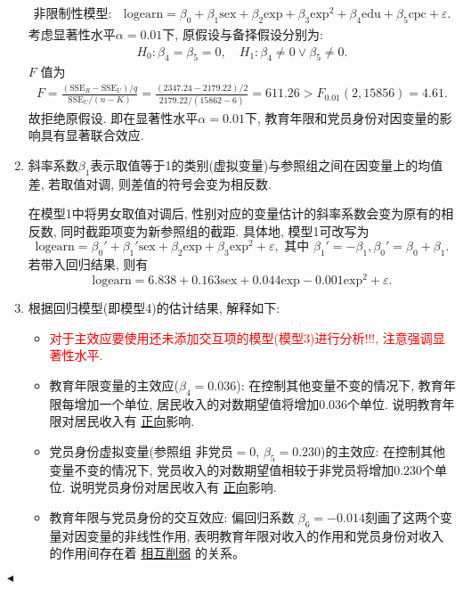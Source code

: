 \documentclass[11pt]{article}
\newenvironment{problem}[2][Problem]{\begin{trivlist}
\item[\hskip \labelsep {\bfseries #1}\hskip \labelsep {\bfseries #2.}]\songti}{\hfill$\blacktriangleleft$\end{trivlist}}
\newcommand\1{\mathds{1}}
\begin{document}
\begin{problem}{1}
\begin{enumerate}[label=(\arabic*)]
\begin{align*}
        \text{非限制性模型: 模型3} \quad &\text{logearn} = \beta_0 + \beta_1 \text{sex} + \beta_2 \text{exp} + \beta_3 \text{exp}^2 + \beta_4 \text{edu} + \beta_5 \text{cpc} + \varepsilon.
    \end{align*}
    考虑显著性水平$\alpha=0.01$下, 原假设与备择假设分别为:
    \begin{align*}
        H_0: \beta_4 = \beta_5 = 0, \quad H_1: \beta_4 \neq 0 \lor \beta_5 \neq 0.
    \end{align*} 
    $F$ 值为 
    \begin{align*}
        F = \frac{(\text{SSE}_R - \text{SSE}_U)/q}{\text{SSE}_U/(n-K)} = \frac{(2347.24-2179.22)/2}{2179.22/(15862 - 6)} = 611.26 > F_{0.01}(2, 15856) = 4.61.
    \end{align*}
    故拒绝原假设. 即在显著性水平$\alpha=0.01$下, 教育年限和党员身份对因变量的影响具有显著联合效应.
    \item  斜率系数$\beta_1$表示取值等于1的类别(虚拟变量)与参照组之间在因变量上的均值差, 若取值对调, 则差值的符号会变为相反数. 

    在模型1中将男女取值对调后, 性别对应的变量估计的斜率系数会变为原有的相反数, 同时截距项变为新参照组的截距. 具体地, 模型1可改写为
    \[
    \text{logearn} = \beta_0' + \beta_1' \text{sex} + \beta_2 \text{exp} + \beta_3 \text{exp}^2 + \varepsilon, \text{ 其中 } \beta_1' = -\beta_1, \beta_0' = \beta_0 + \beta_1.
    \]
    若带入回归结果, 则有
    \[
    \text{logearn} = 6.838 + 0.163 \text{sex} +  0.044 \text{exp} - 0.001 \text{exp}^2 + \varepsilon.
    \]
    \item 根据回归模型(即模型4)的估计结果, 解释如下:
    \begin{itemize}
        \item \textcolor{red}{对于主效应要使用还未添加交互项的模型(模型3)进行分析!!!, 注意强调显著性水平.}
        \item {\kaishu 教育年限变量的主效应($\beta_4 = 0.036$):} 在控制其他变量不变的情况下, 教育年限每增加一个单位, 居民收入的对数期望值将增加$0.036$个单位. 说明教育年限对居民收入有 \underline{正向}影响.
        \item {\kaishu 党员身份虚拟变量(参照组 $\text{非党员}=0$, $\beta_5 = 0.230$)的主效应:} 在控制其他变量不变的情况下, 党员收入的对数期望值相较于非党员将增加$0.230$个单位. 说明党员身份对居民收入有 \underline{正向}影响.
        \item {\kaishu 教育年限与党员身份的交互效应:} 偏回归系数 $\beta_6 = -0.014$刻画了这两个变量对因变量的非线性作用, 表明教育年限对收入的作用和党员身份对收入的作用间存在着 \underline{相互削弱} 的关系。
    \end{itemize}
\end{enumerate}

\end{problem}
\end{document}
